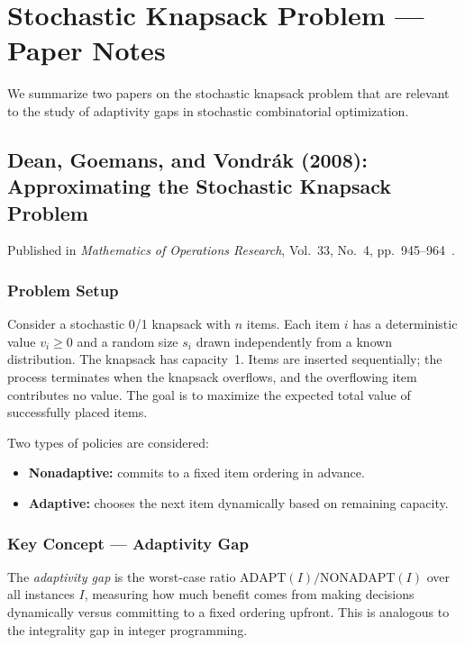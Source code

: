 \section{Stochastic Knapsack Problem --- Paper Notes}\label{sec:sk-notes}

We summarize two papers on the stochastic knapsack problem that are relevant to the study of adaptivity gaps in stochastic combinatorial optimization.

\subsection{Dean, Goemans, and Vondr\'{a}k (2008): Approximating the Stochastic Knapsack Problem}

Published in \emph{Mathematics of Operations Research}, Vol.~33, No.~4, pp.~945--964~\cite{DeanGoemansVondrak2008}.

\subsubsection{Problem Setup}

Consider a stochastic 0/1 knapsack with $n$ items. Each item $i$ has a deterministic value $v_i \ge 0$ and a random size $s_i$ drawn independently from a known distribution. The knapsack has capacity~1. Items are inserted sequentially; the process terminates when the knapsack overflows, and the overflowing item contributes no value. The goal is to maximize the expected total value of successfully placed items.

Two types of policies are considered:
\begin{itemize}
    \item \textbf{Nonadaptive:} commits to a fixed item ordering in advance.
    \item \textbf{Adaptive:} chooses the next item dynamically based on remaining capacity.
\end{itemize}

\subsubsection{Key Concept --- Adaptivity Gap}

The \emph{adaptivity gap} is the worst-case ratio $\mathrm{ADAPT}(I) / \mathrm{NONADAPT}(I)$ over all instances $I$, measuring how much benefit comes from making decisions dynamically versus committing to a fixed ordering upfront. This is analogous to the integrality gap in integer programming.

